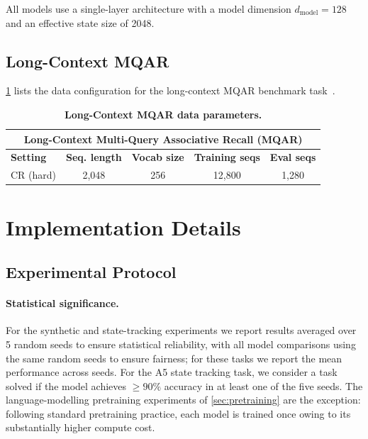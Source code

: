\documentclass{article}
\begin{document}
All models use a single-layer architecture with a model dimension $d_{\text{model}} = 128$ and an effective state size of 2048.

\subsection{Long-Context MQAR}
\label{sec:longcontext-mqar}

\cref{tab:longcontext-mqar-params} lists the data configuration for the long-context MQAR benchmark task~\citep{arora2023zoology}.

\begin{table}[h]
\caption{\textbf{Long-Context MQAR data parameters.}}
\label{tab:longcontext-mqar-params}
\centering
\small
\setlength{\tabcolsep}{6pt}
\renewcommand{\arraystretch}{1.12}
\begin{tabular}{lcccc}
\toprule
\multicolumn{5}{c}{\textbf{Long-Context Multi-Query Associative Recall (MQAR)}} \\
\midrule
\textbf{Setting} & \textbf{Seq. length} & \textbf{Vocab size} & \textbf{Training seqs} & \textbf{Eval seqs} \\
\midrule
CR (hard) & 2,048 & 256 & 12,800 & 1,280 \\
\bottomrule
\end{tabular}
\vskip -0.1in
\end{table}

\newpage
\section{Implementation Details}
\label{app:hyperparams}

\subsection{Experimental Protocol}
\label{sec:exp-protocol}

\paragraph{Statistical significance.}
For the synthetic and state-tracking experiments we report results averaged over 5 random seeds to ensure statistical reliability, with all model comparisons using the same random seeds to ensure fairness; for these tasks we report the mean performance across seeds. For the A5 state tracking task, we consider a task solved if the model achieves $\geq 90\%$ accuracy in at least one of the five seeds. The language-modelling pretraining experiments of \cref{sec:pretraining} are the exception: following standard pretraining practice, each model is trained once owing to its substantially higher compute cost.
\end{document}
